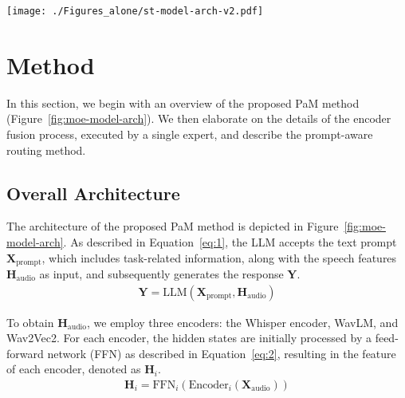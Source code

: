 
\begin{figure*}[t]
\centering
  \centerline{\texttt{[image: ./Figures\_alone/st-model-arch-v2.pdf]}}  
  \caption{The architecture of the proposed PaM method. The output feature of the prompt guides the routing of the MoE adapter where we use a fixed shared expert and a single routed expert. For each expert, the last hidden states of all encoders are concatenated with a set of fused hidden states derived from a fusion weight matrix. Subsequently, an FFN is applied to align with the dimensions of the LLM.}
  \label{fig:moe-model-arch}
  \vspace{-0.5em}
\end{figure*}


\section{Method}

In this section, we begin with an overview of the proposed PaM method (Figure~\ref{fig:moe-model-arch}). We then elaborate on the details of the encoder fusion process, executed by a single expert, and describe the prompt-aware routing method.

\subsection{Overall Architecture}

The architecture of the proposed PaM method is depicted in Figure~\ref{fig:moe-model-arch}. As described in Equation~\ref{eq:1}, the LLM accepts the text prompt $\mathbf{X}_\text{prompt}$, which includes task-related information, along with the speech features $\mathbf{H}_\text{audio}$ as input, and subsequently generates the response $\mathbf{Y}$.
 \begin{align}
 \label{eq:1}
 \mathbf{Y} = \text{LLM}(\mathbf{X}_\text{prompt}, \mathbf{H}_\text{audio})
\end{align}

\noindent To obtain $\mathbf{H}_\text{audio}$, we employ three encoders: the Whisper encoder, WavLM, and Wav2Vec2. For each encoder, the hidden states are initially processed by a feed-forward network (FFN) as described in Equation~\ref{eq:2}, resulting in the feature of each encoder, denoted as $\mathbf{H}_{i}$.
 \begin{align}
 \label{eq:2}
 \mathbf{H}_i = \text{FFN}_i(\text{Encoder}_i(\mathbf{X}_\text{audio}))
\end{align}

